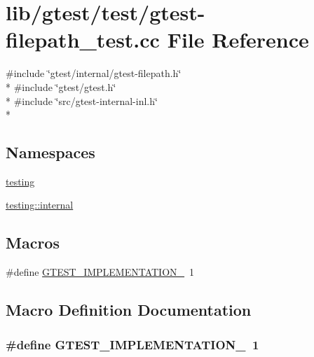\hypertarget{gtest-filepath__test_8cc}{\section{lib/gtest/test/gtest-\/filepath\-\_\-test.cc File Reference}
\label{gtest-filepath__test_8cc}
}
{\ttfamily \#include \char`\"{}gtest/internal/gtest-\/filepath.\-h\char`\"{}}\\*
{\ttfamily \#include \char`\"{}gtest/gtest.\-h\char`\"{}}\\*
{\ttfamily \#include \char`\"{}src/gtest-\/internal-\/inl.\-h\char`\"{}}\\*
\subsection*{Namespaces}
\begin{DoxyCompactItemize}
\item 
\hyperlink{namespacetesting}{testing}
\item 
\hyperlink{namespacetesting_1_1internal}{testing\-::internal}
\end{DoxyCompactItemize}
\subsection*{Macros}
\begin{DoxyCompactItemize}
\item 
\#define \hyperlink{gtest-filepath__test_8cc_a83bd232fd1077579fada92c31bb7469f}{G\-T\-E\-S\-T\-\_\-\-I\-M\-P\-L\-E\-M\-E\-N\-T\-A\-T\-I\-O\-N\-\_\-}~1
\end{DoxyCompactItemize}


\subsection{Macro Definition Documentation}
\hypertarget{gtest-filepath__test_8cc_a83bd232fd1077579fada92c31bb7469f}{
\subsubsection[{G\-T\-E\-S\-T\-\_\-\-I\-M\-P\-L\-E\-M\-E\-N\-T\-A\-T\-I\-O\-N\-\_\-}]{\setlength{\rightskip}{0pt plus 5cm}\#define G\-T\-E\-S\-T\-\_\-\-I\-M\-P\-L\-E\-M\-E\-N\-T\-A\-T\-I\-O\-N\-\_\-~1}}\label{gtest-filepath__test_8cc_a83bd232fd1077579fada92c31bb7469f}


